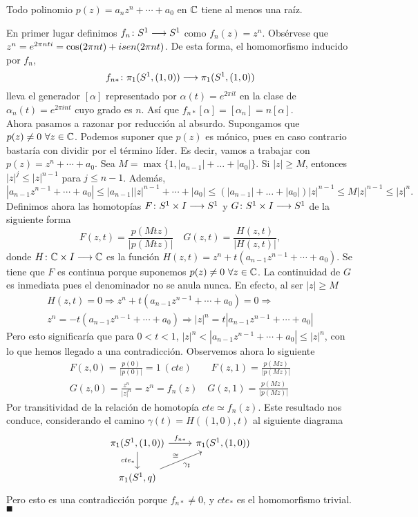 \documentclass[GTS.tex]{subfiles}
\begin{document}
\newpage 

\begin{teorema}
Todo polinomio $p(z)=a_n z^n+\cdots +a_0$ en $\mathbb{C}$ tiene al menos una raíz.
\end{teorema}
\begin{dem}
En primer lugar definimos $f_n\colon{S^1}\longrightarrow{S^1}$ como $f_n(z)=z^n$. Obsérvese que $z^n=e^{2\pi nti}=\cos(2\pi nt)+isen (2\pi nt)$. De esta forma, el homomorfismo inducido por $f_n$,
\[
f_{n*}\colon{\pi_1(S^1,(1,0))}\longrightarrow{\pi_1(S^1,(1,0))}\\
\]
lleva el generador $[\alpha]$ representado por $\alpha(t)=e^{2\pi it}$ en la clase de $\alpha_n(t)=e^{2\pi i nt}$ cuyo grado es $n$. Así que $f_{n*}[\alpha]=[\alpha_n]=n[\alpha]$.\\
Ahora pasamos a razonar por reducción al absurdo. Supongamos que $p(z)\neq 0\ \forall z\in\C$. Podemos suponer que $p(z)$ es mónico, pues en caso contrario bastaría con dividir por el término líder. Es decir, vamos a trabajar con $p(z)=z^n+\cdots + a_0$. Sea $M=\max\{1,|a_{n-1}|+\dots +|a_0|\}$. Si $|z|\geq M$, entonces $|z|^j\leq |z|^{n-1}$ para $j\leq n-1$. Además,
\[
|a_{n-1}z^{n-1}+\cdots +a_0|\leq |a_{n-1}||z|^{n-1}+\cdots +|a_0|\leq (|a_{n-1}|+\dots +|a_0|)|z|^{n-1}\leq M|z|^{n-1}\leq|z|^n.
\]
Definimos ahora las homotopías $F\colon{S^1\times I}\longrightarrow{S^1}$ y $G\colon{S^1\times I}\longrightarrow{S^1}$ de la siguiente forma
\[
F(z,t)=\frac{p(Mtz)}{|p(Mtz)|}\quad G(z,t)=\frac{H(z,t)}{|H(z,t)|},
\]
donde $H\colon{\mathbb{C}\times I}\longrightarrow{\mathbb{C}}$ es la función $H(z,t)=z^n+t(a_{n-1}z^{n-1}+\cdots +a_0)$. Se tiene que $F$ es continua porque suponemos $p(z)\neq 0\ \forall z\in\C$. La continuidad de $G$ es inmediata pues el denominador no se anula nunca. En efecto, al ser $|z|\geq M$
\begin{gather*}
H(z,t)=0\Rightarrow z^n+t(a_{n-1}z^{n-1}+\cdots +a_0)=0\Rightarrow \\
z^n=-t(a_{n-1}z^{n-1}+\cdots +a_0)\Rightarrow |z|^n=t|a_{n-1}z^{n-1}+\cdots +a_0|
\end{gather*}
Pero esto significaría que para $0<t<1$, $|z|^n<|a_{n-1}z^{n-1}+\cdots +a_0|\leq|z|^n$, con lo que hemos llegado a una contradicción. Observemos ahora lo siguiente
\begin{gather*}
F(z,0)=\frac{p(0)}{|p(0)|}=1\ (cte)\qquad F(z,1)=\frac{p(Mz)}{|p(Mz)|}\\
G(z,0)=\frac{z^n}{|z|^n}=z^n=f_n(z)\quad G(z,1)=\frac{p(Mz)}{|p(Mz)|}
\end{gather*}
Por transitividad de la relación de homotopía $cte\simeq f_n(z)$. Este resultado nos conduce, considerando el camino $\gamma(t)=H((1,0),t)$ al siguiente diagrama
\[
\begin{tikzcd}
\pi_1(S^1,(1,0)) \ar[r, "f_{n*} "]\arrow[d,"cte_* "'] & \pi_1(S^1,(1,0))\\
\pi_1(S^1,q)\arrow[ur,"\gamma_\sharp "',"\cong"]
\end{tikzcd}
\]
Pero esto es una contradicción porque $f_{n*}\neq 0$, y $cte_*$ es el homomorfismo trivial. $\QED$
\end{dem}
\end{document}
